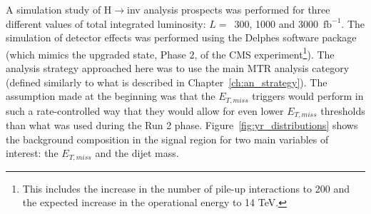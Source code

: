 \hspace{10pt} A simulation study of H$\rightarrow$inv analysis prospects was performed for three different values of total integrated luminosity: $L=$~300, 1000 and 3000~$\text{fb}^{-1}$. The simulation of detector effects was performed using the Delphes software package~\cite{paper:delphes} (which mimics the upgraded state, Phase 2, of the CMS experiment\footnote{This includes the increase in the number of pile-up interactions to 200 and the expected increase in the operational energy to 14 TeV.}). The analysis strategy approached here was to use the main MTR analysis category (defined similarly to what is described in Chapter~\ref{ch:an_strategy}). The assumption made at the beginning was that the $E_{T,miss}$ triggers would perform in such a rate-controlled way that they would allow for even lower $E_{T,miss}$ thresholds than what was used during the Run 2 phase. Figure~\ref{fig:yr_distributions} shows the background composition in the signal region for two main variables of interest: the $E_{T,miss}$ and the dijet mass.


